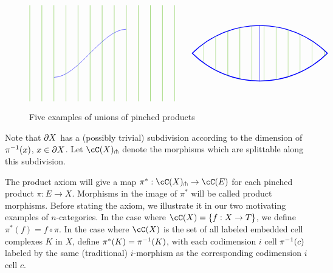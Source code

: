 \begin{figure}[t]
$$\begin{tikzpicture}[baseline=0]
\begin{scope}
\draw[blue] (1,-1) .. controls  (2,-1) and (3,1) .. (4,1);
\foreach \x in {0, 0.5, ..., 6} {
	\draw[green!50!brown] (\x,-2) -- (\x,2);
}
\end{scope}
\end{tikzpicture}
\qquad
\begin{tikzpicture}[baseline=0]
\begin{scope}
\path[clip] (0,0) arc (135:45:4) arc (-45:-135:4);
\draw[blue,line width=2pt] (0,0) arc (135:45:4) arc (-45:-135:4);
\draw[blue] (2.82,-5) -- (2.83,5);
\foreach \x in {0, 0.5, ..., 6} {
	\draw[green!50!brown] (\x,-2) -- (\x,2);
}
\end{scope}
\end{tikzpicture}
$$
\caption{Five examples of unions of pinched products}\label{pinched_prod_unions}
\end{figure}

Note that $\partial X$ has a (possibly trivial) subdivision according to 
the dimension of $\pi^{-1}(x)$, $x\in \partial X$.
Let $\cC(X)\trans{}$ denote the morphisms which are splittable along this subdivision.

The product axiom will give a map $\pi^*:\cC(X)\trans{}\to \cC(E)$ for each pinched product
$\pi:E\to X$.
Morphisms in the image of $\pi^*$ will be called product morphisms.
Before stating the axiom, we illustrate it in our two motivating examples of $n$-categories.
In the case where $\cC(X) = \{f: X\to T\}$, we define $\pi^*(f) = f\circ\pi$.
In the case where $\cC(X)$ is the set of all labeled embedded cell complexes $K$ in $X$, 
define $\pi^*(K) = \pi^{-1}(K)$, with each codimension $i$ cell $\pi^{-1}(c)$ labeled by the
same (traditional) $i$-morphism as the corresponding codimension $i$ cell $c$.



